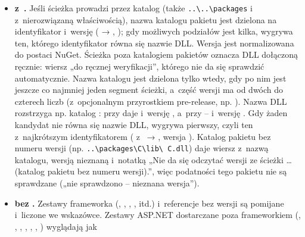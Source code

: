 \begin{itemize}
         oznacza zależność deweloperską. Referencje bez wersji są
        liczone i~dają wskazówkę, żeby wkleić .
  \item \textbf{ z~.} Jeśli ścieżka prowadzi przez
        katalog  (także \texttt{..\textbackslash ..\textbackslash packages}
        i~ z~nierozwiązaną właściwością), nazwa katalogu
        pakietu jest dzielona na identyfikator i~wersję
        ( → ,
        ); gdy możliwych podziałów jest kilka, wygrywa ten, którego
        identyfikator równa się nazwie DLL. Wersja jest normalizowana do postaci NuGet. Ścieżka
        poza katalogiem pakietów oznacza DLL dołączoną ręcznie: wiersz „do ręcznej weryfikacji”,
        którego nie da się sprawdzić automatycznie. Nazwa katalogu jest dzielona tylko wtedy,
        gdy po nim jest jeszcze co najmniej jeden segment ścieżki, a~część wersji ma od dwóch
        do czterech liczb (z~opcjonalnym przyrostkiem pre-release, np.
        ). Nazwa DLL rozstrzyga np. katalog
        : przy  daje  i~wersję ,
        a~przy  --  i~wersję . Gdy żaden kandydat
        nie równa się nazwie DLL, wygrywa pierwszy, czyli ten z~najkrótszym identyfikatorem
        ( z~ → , wersja
        ). Katalog pakietu bez numeru wersji (np.
        \texttt{..\textbackslash packages\textbackslash C\textbackslash lib\textbackslash
        C.dll}) daje wiersz z~nazwą katalogu, wersją nieznaną i~notatką „Nie da się odczytać
        wersji ze ścieżki … (katalog pakietu bez numeru wersji).”, więc podatności tego
        pakietu nie są sprawdzane („nie sprawdzono -- nieznana wersja”).
  \item \textbf{ bez .} Zestawy frameworka
        (, , ,
        ,  itd.) i~referencje bez wersji są
        pomijane i~liczone we wskazówce. Zestawy ASP.NET dostarczane poza frameworkiem
        (, , ,
        , ,
        , ) wyglądają jak

\end{itemize}
